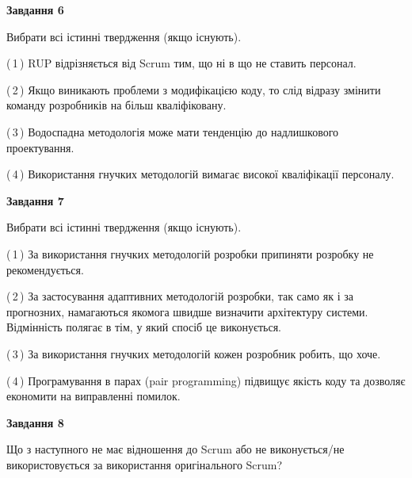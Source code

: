 \documentclass[10pt, ukrainian]{article}
\begin{document}
{\begin {large}
\newpage

{\begin {center}\textbf{Завдання 6}\end {center}}\par
Вибрати всі істинні твердження (якщо існують).\par
\vspace{2mm}



(\,1\,) RUP відрізняється від Scrum тим, що ні в що не ставить персонал.%



(\,2\,) Якщо виникають проблеми з модифікацією коду, то слід відразу змінити команду розробників на більш кваліфіковану.%



(\,3\,) Водоспадна методологія може мати тенденцію до надлишкового проектування. %



(\,4\,) Використання гнучких методологій вимагає високої кваліфікації персоналу. %


{\begin {center}\textbf{Завдання 7}\end {center}}\par
Вибрати всі істинні твердження (якщо існують).\par
\vspace{2mm}



(\,1\,) За використання гнучких методологій розробки припиняти розробку не рекомендується. %



(\,2\,) За застосування адаптивних методологій розробки, так само як і за прогнозних, намагаються якомога швидше визначити архітектуру системи. Відмінність полягає в тім, у який спосіб це виконується.%



(\,3\,) За використання гнучких методологій кожен розробник робить, що хоче. %



(\,4\,) Програмування в парах (pair programming) підвищує якість коду та дозволяє економити на виправленні помилок. %


{\begin {center}\textbf{Завдання 8}\end {center}}\par
Що з наступного не має відношення до Scrum або не виконується/не використовується за використання оригінального Scrum?\par
\vspace{2mm}




\end{large}}
\end{document}
